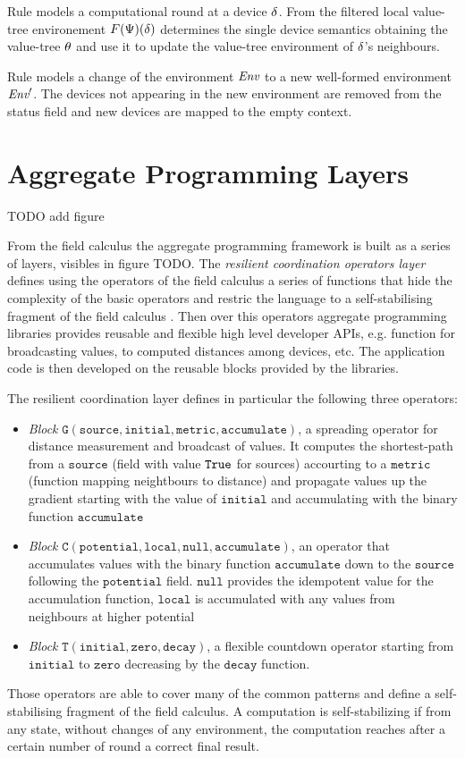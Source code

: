 Rule  models a computational round at a device $\delta$. From the filtered local value-tree environement $F(\Psi)(\delta)$ determines the single device semantics obtaining the value-tree $\theta$ and use it to update the value-tree environment of $\delta$'s neighbours.

Rule  models a change of the environment $\textit{Env}$ to a new well-formed environment $\textit{Env}'$. The devices not appearing in the new environment are removed from the status field and new devices are mapped to the empty context.


\section{Aggregate Programming Layers}

TODO add figure

From the field calculus the aggregate programming framework is built as a series of layers, visibles in figure TODO. The \textit{resilient coordination operators layer} defines using the operators of the field calculus a series of functions that hide the complexity of the basic operators and restric the language to a self-stabilising fragment  of the field calculus \cite{SelfStabilizing}. Then over this operators aggregate programming libraries provides reusable and flexible high level developer APIs, e.g. function for broadcasting values, to computed distances among devices, etc. The application code is then developed on the reusable blocks provided by the libraries.

The resilient coordination layer defines in particular the following three operators:
\begin{itemize}
\item \textit{Block} $\mathtt{G(source, initial, metric, accumulate)}$, a spreading operator for distance measurement and broadcast of values. It computes the shortest-path from a $\mathtt{source}$ (field with value $\mathtt{True}$ for sources) accourting to a $\mathtt{metric}$ (function mapping neightbours to distance) and propagate values up the gradient starting with the value of $\mathtt{initial}$ and accumulating with the binary function $\mathtt{accumulate}$
\item \textit{Block} $\mathtt{C(potential, local, null, accumulate)}$, an operator that accumulates values with the binary function $\mathtt{accumulate}$ down to the $\mathtt{source}$ following the $\mathtt{potential}$ field. $\mathtt{null}$ provides the idempotent value for the accumulation function, $\mathtt{local}$ is accumulated with any values from neighbours at higher potential
\item \textit{Block} $\mathtt{T(initial, zero, decay)}$, a flexible countdown operator starting from $\mathtt{initial}$ to $\mathtt{zero}$ decreasing by the $\mathtt{decay}$ function.
\end{itemize}

Those operators are able to cover many of the common patterns and define a self-stabilising fragment of the field calculus. A computation is self-stabilizing if from any state, without changes of any environment, the computation reaches after a certain number of round a correct final result.
